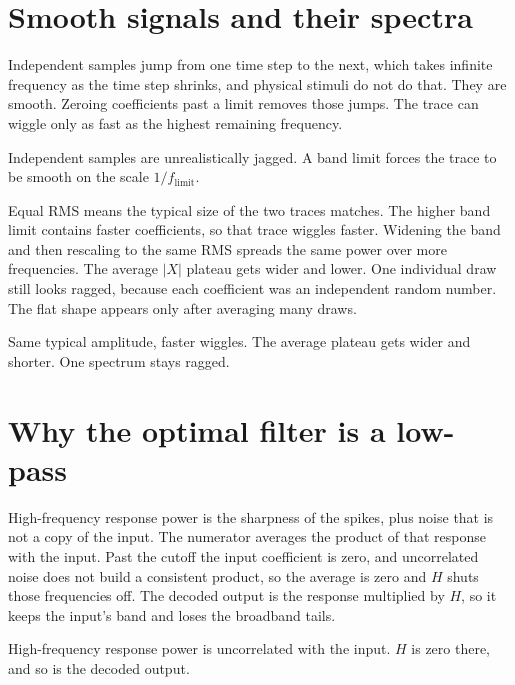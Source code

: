 \documentclass[11pt,letterpaper]{article}
\newcommand{\ans}[1]{\par\vspace{2pt}{\bfseries #1}\quad}
\begin{document}
\section{Smooth signals and their spectra}

\ans{1.}
Independent samples jump from one time step to the next, which takes infinite frequency as the time step shrinks, and physical stimuli do not do that. They are smooth. Zeroing coefficients past a limit removes those jumps. The trace can wiggle only as fast as the highest remaining frequency.
\begin{result}
Independent samples are unrealistically jagged. A band limit forces the trace to be smooth on the scale \(1/f_{\mathrm{limit}}\).
\end{result}

\ans{2.}
Equal RMS means the typical size of the two traces matches. The higher band limit contains faster coefficients, so that trace wiggles faster. Widening the band and then rescaling to the same RMS spreads the same power over more frequencies. The average \(|X|\) plateau gets wider and lower. One individual draw still looks ragged, because each coefficient was an independent random number. The flat shape appears only after averaging many draws.
\begin{result}
Same typical amplitude, faster wiggles. The average plateau gets wider and shorter. One spectrum stays ragged.
\end{result}

\section{Why the optimal filter is a low-pass}

\ans{1.}
High-frequency response power is the sharpness of the spikes, plus noise that is not a copy of the input. The numerator averages the product of that response with the input. Past the cutoff the input coefficient is zero, and uncorrelated noise does not build a consistent product, so the average is zero and \(H\) shuts those frequencies off. The decoded output is the response multiplied by \(H\), so it keeps the input's band and loses the broadband tails.
\begin{result}
High-frequency response power is uncorrelated with the input. \(H\) is zero there, and so is the decoded output.
\end{result}
\end{document}
